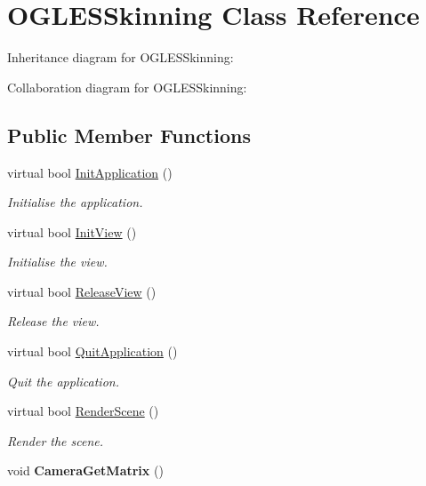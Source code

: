 \hypertarget{class_o_g_l_e_s_skinning}{\section{O\+G\+L\+E\+S\+Skinning Class Reference}
\label{class_o_g_l_e_s_skinning}
}


Inheritance diagram for O\+G\+L\+E\+S\+Skinning\+:


Collaboration diagram for O\+G\+L\+E\+S\+Skinning\+:
\subsection*{Public Member Functions}
\begin{DoxyCompactItemize}
\item 
virtual bool \hyperlink{class_o_g_l_e_s_skinning_a210288abdf78201daed14c8112164f1d}{Init\+Application} ()
\begin{DoxyCompactList}\small\item\em Initialise the application. \end{DoxyCompactList}\item 
virtual bool \hyperlink{class_o_g_l_e_s_skinning_a70319630ffc36a323ebd002d1befa72c}{Init\+View} ()
\begin{DoxyCompactList}\small\item\em Initialise the view. \end{DoxyCompactList}\item 
virtual bool \hyperlink{class_o_g_l_e_s_skinning_a8192ef1844f12bc7937f57a3ba2784e1}{Release\+View} ()
\begin{DoxyCompactList}\small\item\em Release the view. \end{DoxyCompactList}\item 
virtual bool \hyperlink{class_o_g_l_e_s_skinning_ab85ca73befc6491fb52c1a4640478cf4}{Quit\+Application} ()
\begin{DoxyCompactList}\small\item\em Quit the application. \end{DoxyCompactList}\item 
virtual bool \hyperlink{class_o_g_l_e_s_skinning_af9a394371161f14686751d0ace22482d}{Render\+Scene} ()
\begin{DoxyCompactList}\small\item\em Render the scene. \end{DoxyCompactList}\item 
\hypertarget{class_o_g_l_e_s_skinning_adb1d23817edaef892582d6b565c31f8e}{void {\bfseries Camera\+Get\+Matrix} ()}\label{class_o_g_l_e_s_skinning_adb1d23817edaef892582d6b565c31f8e}


\end{DoxyCompactItemize}
